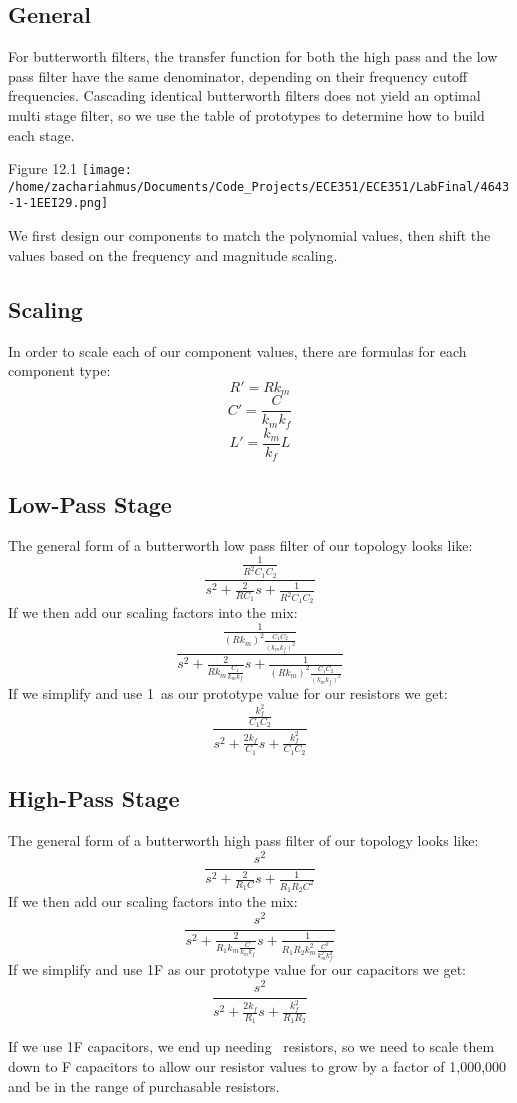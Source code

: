 \documentclass[12pt,a4paper]{article}
\begin{document}
\subsection*{General}
For butterworth filters, the transfer function for both the high pass and the low pass filter have the same denominator, depending on their frequency cutoff frequencies. Cascading identical butterworth filters does not yield an optimal multi stage filter, so we use the table of prototypes to determine how to build each stage. 

\begin{center}
	{Figure 12.1}
	\texttt{[image: /home/zachariahmus/Documents/Code\_Projects/ECE351/ECE351/LabFinal/4643-1-1EEI29.png]}
\end{center}

We first design our components to match the polynomial values, then shift the values based on the frequency and magnitude scaling. 

\subsection*{Scaling}

In order to scale each of our component values, there are formulas for each component type: 
$$R'=Rk_m$$
$$C'=\frac{C}{k_mk_f}$$
$$L' = \frac{k_m}{k_f}L$$

\subsection*{Low-Pass Stage}
\begin{center}
	The general form of a butterworth low pass filter of our topology looks like: 
$$\frac{\frac{1}{R^2C_1C_2}}{s^2+\frac{2}{RC_1}s+\frac{1}{R^2C_1C_2}}$$
If we then add our scaling factors into the mix:
$$\frac{\frac{1}{(Rk_m)^2\frac{C_1C_2}{(k_mk_f)^2}}}{s^2+\frac{2}{Rk_m\frac{C_1}{k_mk_f}}s+\frac{1}{(Rk_m)^2\frac{C_1C_2}{(k_mk_f)^2}}}$$
If we simplify and use 1\Omega\ as our prototype value for our resistors we get:
$$\frac{\frac{k_f^2}{C_1C_2}}{s^2+\frac{2k_f}{C_1}s+\frac{k_f^2}{C_1C_2}}$$
\end{center}
\subsection*{High-Pass Stage}
\begin{center}
The general form of a butterworth high pass filter of our topology looks like:
$$\frac{s^2}{s^2+\frac{2}{R_1C}s+\frac{1}{R_1R_2C^2}}$$
If we then add our scaling factors into the mix:
$$\frac{s^2}{s^2+\frac{2}{R_1k_m\frac{C}{k_mk_f}}s+\frac{1}{R_1R_2k_m^2\frac{C^2}{k_m^2k_f^2}}}$$
If we simplify and use 1F as our prototype value for our capacitors we get:
$$\frac{s^2}{s^2+\frac{2k_f}{R_1}s+\frac{k_f^2}{R_1R_2}}$$

If we use 1F capacitors, we end up needing \mu\Omega\ resistors, so we need to scale them down to \mu F capacitors to allow our resistor values to grow by a factor of 1,000,000 and be in the range of purchasable resistors.
\end{center}
\end{document}
